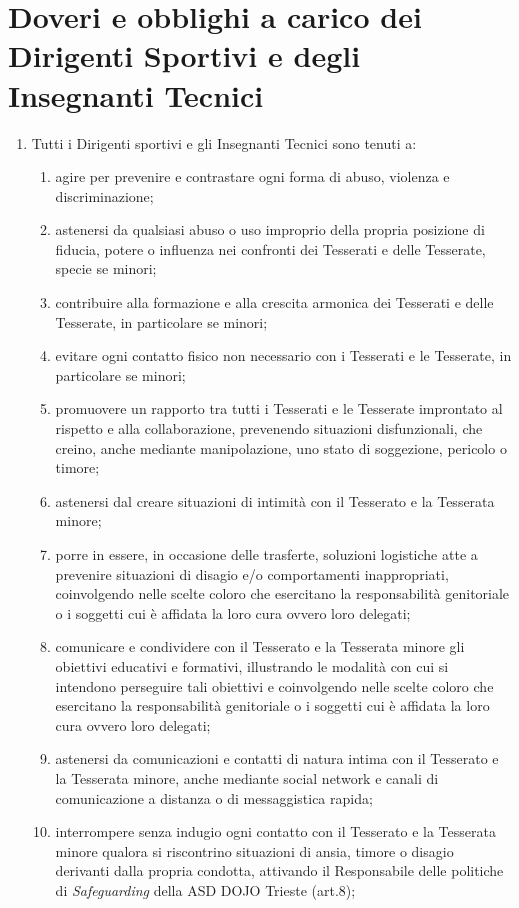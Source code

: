 \documentclass{djtsasddoc}
\begin{document}
	\section{Doveri e obblighi a carico dei Dirigenti Sportivi e degli Insegnanti Tecnici}
	\begin{enumerate}
		\item Tutti i Dirigenti sportivi e gli Insegnanti Tecnici sono tenuti a:
		\begin{enumerate}
			\item agire per prevenire e contrastare ogni forma di abuso, violenza e discriminazione;
			\item astenersi da qualsiasi abuso o uso improprio della propria posizione di fiducia, potere o 	influenza nei confronti dei Tesserati e delle Tesserate, specie se minori;
			\item contribuire alla formazione e alla crescita armonica dei Tesserati e delle Tesserate, in 	particolare	se minori;
			\item evitare ogni contatto fisico non necessario con i Tesserati e le Tesserate, in particolare se 	minori;
			\item promuovere un rapporto tra tutti i Tesserati e le Tesserate improntato al rispetto e alla	collaborazione, prevenendo situazioni disfunzionali, che creino, anche mediante manipolazione, uno stato di soggezione, pericolo o timore;
			\item astenersi dal creare situazioni di intimità con il Tesserato e la Tesserata minore;
			\item porre in essere, in occasione delle trasferte, soluzioni logistiche atte a prevenire situazioni di disagio e/o comportamenti inappropriati, coinvolgendo nelle scelte coloro che esercitano la	responsabilità genitoriale o i soggetti cui è affidata la loro cura ovvero loro delegati;
			\item comunicare e condividere con il Tesserato e la Tesserata minore gli obiettivi educativi e	formativi,	illustrando le modalità con cui si intendono perseguire tali obiettivi e	coinvolgendo nelle scelte coloro che esercitano la responsabilità genitoriale o i soggetti cui è affidata la loro cura ovvero loro delegati;
			\item astenersi da comunicazioni e contatti di natura intima con il Tesserato e la Tesserata minore, 	anche mediante social network e canali di comunicazione a distanza o di messaggistica rapida;
			\item interrompere senza indugio ogni contatto con il Tesserato e la Tesserata minore qualora si 	riscontrino situazioni di ansia, timore o disagio derivanti dalla propria condotta, attivando il 	Responsabile delle politiche di \textit{Safeguarding} della ASD DOJO Trieste (art.8);

\end{enumerate}
\end{enumerate}
\end{document}
